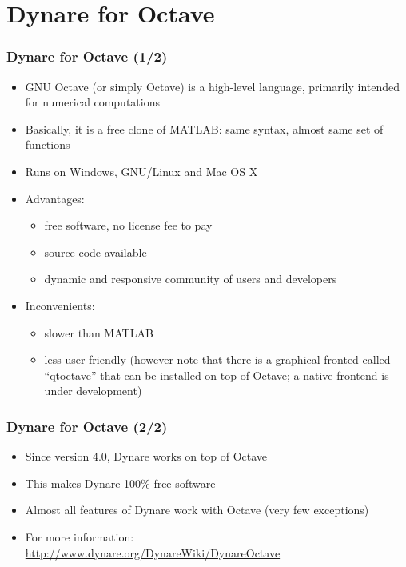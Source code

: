 \documentclass{beamer}
\begin{document}

\section{Dynare for Octave}

\begin{frame}
  \frametitle{Dynare for Octave (1/2)}
  \begin{itemize}
  \item GNU Octave (or simply Octave) is a high-level language, primarily intended for numerical computations
  \item Basically, it is a free clone of MATLAB: same syntax, almost same set of functions
  \item Runs on Windows, GNU/Linux and Mac OS X
  \item Advantages:
    \begin{itemize}
    \item free software, no license fee to pay
    \item source code available
    \item dynamic and responsive community of users and developers
    \end{itemize}
  \item Inconvenients:
    \begin{itemize}
    \item slower than MATLAB
    \item less user friendly (however note that there is a graphical fronted
      called ``qtoctave'' that can be installed on top of Octave; a native
      frontend is under development)
    \end{itemize}
  \end{itemize}
\end{frame}

\begin{frame}
  \frametitle{Dynare for Octave (2/2)}
  \begin{itemize}
  \item Since version 4.0, Dynare works on top of Octave
  \item This makes Dynare 100\% free software
  \item Almost all features of Dynare work with Octave (very few exceptions)
  \item For more information: \\
    \url{http://www.dynare.org/DynareWiki/DynareOctave}
  \end{itemize}
\end{frame}
\end{document}
